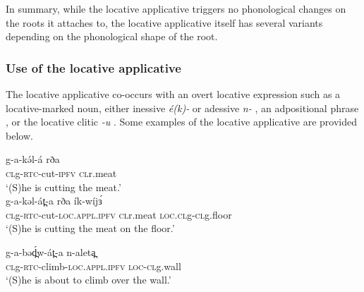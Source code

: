 In summary, while the locative applicative triggers no phonological changes on the roots it attaches to, the locative applicative itself has several variants depending on the phonological shape of the root. 






\subsubsection{Use of the locative applicative}\label{sec:ch11:locappluse}

The locative applicative co-occurs with an overt locative expression such as a locative-marked noun, either inessive \textit{é(k)-}  or adessive \textit{n-} , an adpositional phrase , or  the locative clitic \textit{-u} . Some examples of the locative applicative are provided below.

\ea
\ea 	\gll g-a-kə́l-á 		rða  \\
\textsc{cl}g-\textsc{rtc}-cut-\textsc{ipfv}	\textsc{cl}r.meat		\\
\glt ‘(S)he is cutting the meat.’\\

\ex 	\gll g-a-kəl-át̪-a 				rða 		ík-wíjɜ́\\
	\textsc{cl}g-\textsc{rtc}-cut-\textsc{loc.appl.ipfv}		\textsc{cl}r.meat	\textsc{loc.cl}g-\textsc{cl}g.floor\\
	\glt ‘(S)he is cutting the meat on the floor.’\\ \label{ex:ch11:loce}

\ex 	\gll g-a-bəd̪́w-át̪-a 				n-aleta̪  \\
	\textsc{cl}g-\textsc{rtc}-climb-\textsc{loc.appl.ipfv}	\textsc{loc-cl}g.wall\\
	\glt ‘(S)he is about to climb over the wall.’\\ \label{ex:ch11:locn}

